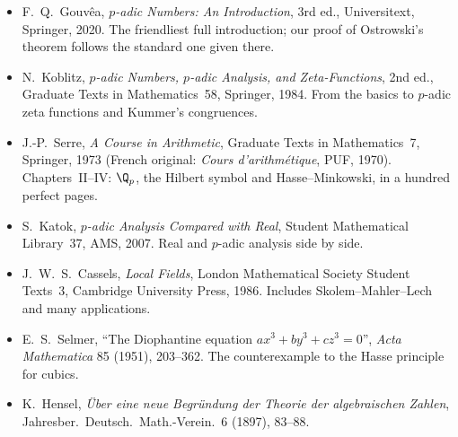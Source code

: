 \begin{itemize}
\item F.~Q.~Gouv\^ea, \emph{$p$-adic Numbers: An Introduction}, 3rd ed., Universitext, Springer, 2020. The friendliest full introduction; our proof of Ostrowski's theorem follows the standard one given there.
\item N.~Koblitz, \emph{$p$-adic Numbers, $p$-adic Analysis, and Zeta-Functions}, 2nd ed., Graduate Texts in Mathematics~58, Springer, 1984. From the basics to $p$-adic zeta functions and Kummer's congruences.
\item J.-P.~Serre, \emph{A Course in Arithmetic}, Graduate Texts in Mathematics~7, Springer, 1973 (French original: \emph{Cours d'arithm\'etique}, PUF, 1970). Chapters~II--IV: $\Q_p$, the Hilbert symbol and Hasse--Minkowski, in a hundred perfect pages.
\item S.~Katok, \emph{$p$-adic Analysis Compared with Real}, Student Mathematical Library~37, AMS, 2007. Real and $p$-adic analysis side by side.
\item J.~W.~S.~Cassels, \emph{Local Fields}, London Mathematical Society Student Texts~3, Cambridge University Press, 1986. Includes Skolem--Mahler--Lech and many applications.
\item E.~S.~Selmer, ``The Diophantine equation $ax^3+by^3+cz^3=0$'', \emph{Acta Mathematica} 85 (1951), 203--362. The counterexample to the Hasse principle for cubics.
\item K.~Hensel, \emph{\"Uber eine neue Begr\"undung der Theorie der algebraischen Zahlen}, Jahresber.\ Deutsch.\ Math.-Verein.\ 6 (1897), 83--88.
\end{itemize}

